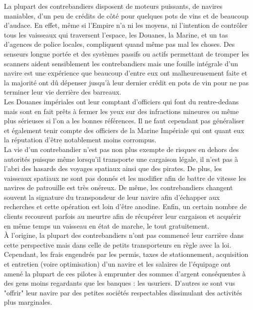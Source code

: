 \documentclass[twoside]{article}
\begin{document}
La plupart des contrebandiers disposent de moteurs puissants, de navires maniables, d'un peu de crédits de côté pour quelques pots de vins et de beaucoup d'audace. En effet, même si l'Empire n'a ni les moyens, ni l'intention de contrôler tous les vaisseaux qui traversent l'espace, les Douanes, la Marine, et un tas d'agences de police locales, compliquent quand même pas mal les choses. Des senseurs longue portée et des systèmes passifs ou actifs permettant de tromper les scanners aident sensiblement les contrebandiers mais une fouille intégrale d'un navire est une expérience que beaucoup d'entre eux ont malheureusement faite et la majorité ont dû dépenser jusqu'à leur dernier crédit en pots de vin pour ne pas terminer leur vie derrière des barreaux.\\

Les Douanes impériales ont leur comptant d'officiers qui font du rentre-dedans mais sont en fait prêts à fermer les yeux sur des infractions mineures ou même plus sérieuses si l'on a les bonnes références. Il ne faut cependant pas généraliser et également tenir compte des officiers de la Marine Impériale qui ont quant eux la réputation d'être notablement moins corrompus.\\

La vie d'un contrebandier n'est pas non plus exempte de risques en dehors des autorités puisque même lorsqu'il transporte une cargaison légale, il n'est pas à l'abri des hasards des voyages spatiaux ainsi que des pirates.
De plus, les vaisseaux spatiaux ne sont pas donnés et les modifier afin de battre de vitesse les navires de patrouille est très onéreux. De même, les contrebandiers changent souvent la signature du transpondeur de leur navire afin d'échapper aux recherches et cette opération est loin d'être anodine. Enfin, un certain nombre de clients recourent parfois au meurtre afin de récupérer leur cargaison et acquérir en même temps un vaisseau en état de marche, le tout gratuitement.\\

À l'origine, la plupart des contrebandiers n'ont pas commencé leur carrière dans cette perspective mais dans celle de petits transporteurs en règle avec la loi. Cependant, les frais engendrés par les permis, taxes de stationnement, acquisition et entretien (voire optimisation) d'un navire et les salaires de l'équipage ont amené la plupart de ces pilotes à emprunter des sommes d'argent conséquentes à des gens moins regardants que les banques : les usuriers. D'autres se sont vus "offrir" leur navire par des petites sociétés respectables dissimulant des activités plus marginales.\\
\end{document}
